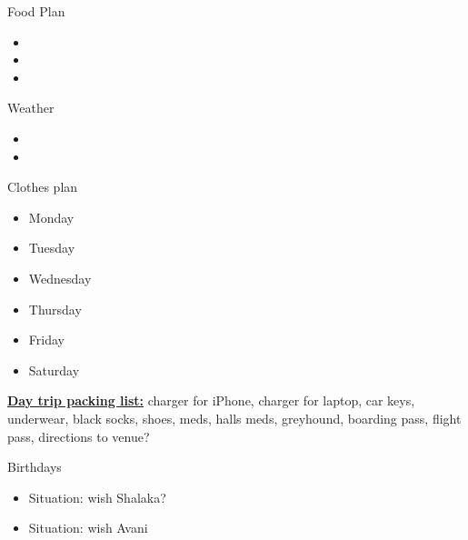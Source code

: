\documentclass[serif, mathserif, final]{beamer}
\begin{document}
\begin{frame}
\begin{columns}
      \begin{column}{0.25\linewidth}
        
        \begin{block}{Food Plan} 
          \begin{itemize}
            \tiny \item \tiny 
          \item \tiny 
          \item \tiny 
          \end{itemize}
        \end{block} 
        
        \begin{block}{Weather}
          \begin{itemize}
            \tiny \item \tiny 
          \item \tiny
          \end{itemize}
        \end{block} 

      \begin{block}{Clothes plan} 
        \begin{itemize}
          \tiny \item \tiny Monday
        \item \tiny Tuesday
        \item \tiny Wednesday
        \item \tiny Thursday
        \item \tiny Friday
          \item \tiny Saturday
        \end{itemize} 
      \end{block}



      \textbf{\underline{Day trip packing list:}} charger for iPhone, charger for laptop,
      car keys, underwear, black socks, shoes, meds, halls meds, greyhound,
      boarding pass, flight pass, directions to venue? \\ 

      \begin{block} {Birthdays}       
        \begin{itemize} 
        \tiny  \item \tiny Situation: wish Shalaka? 
        \item \tiny Situation: wish Avani 
        \end{itemize} 
      \end{block} 


\end{column}
\end{columns}
\end{frame}
\end{document}
